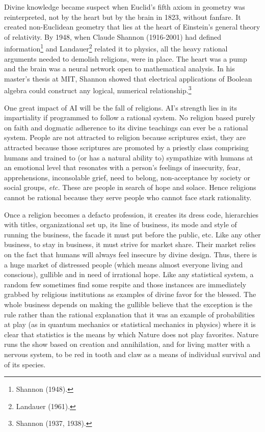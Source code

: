 \begin{multicols}{2}
Divine knowledge became suspect when Euclid's fifth axiom in geometry was reinterpreted, not by the heart but by the brain in 1823, without fanfare. It created non-Euclidean geometry that lies at the heart of Einstein's general theory of relativity. By 1948, when Claude Shannon (1916-2001) had defined information\footnote{Shannon (1948).}  and Landauer\footnote{Landauer (1961).}  related it to physics, all the heavy rational arguments needed to demolish religions, were in place. The heart was a pump and the brain was a neural network open to mathematical analysis. In his master's thesis at MIT, Shannon showed that electrical applications of Boolean algebra could construct any logical, numerical relationship.\footnote{Shannon (1937, 1938).}

One great impact of AI will be the fall of religions. AI's strength lies in its impartiality if programmed to follow a rational system. No religion based purely on faith and dogmatic adherence to its divine teachings can ever be a rational system. People are not attracted to religion because scriptures exist, they are attracted because those scriptures are promoted by a priestly class comprising humans and trained to (or has a natural ability to) sympathize with humans at an emotional level that resonates with a person's feelings of insecurity, fear, apprehensions, inconsolable grief, need to belong, non-acceptance by society or social groups, \textit{etc.} These are people in search of hope and solace. Hence religions cannot be rational because they serve people who cannot face stark rationality.

Once a religion becomes a defacto profession, it creates its dress code, hierarchies with titles, organizational set up, its line of business, its mode and style of running the business, the facade it must put before the public, etc. Like any other business, to stay in business, it must strive for market share. Their market relies on the fact that humans will always feel insecure by divine design. Thus, there is a huge market of distressed people (which means almost everyone living and conscious), gullible and in need of irrational hope. Like any statistical system, a random few sometimes find some respite and those instances are immediately grabbed by religious institutions as examples of divine favor for the blessed. The whole business depends on making the gullible believe that the exception is the rule rather than the rational explanation that it was an example of probabilities at play (as in quantum mechanics or statistical mechanics in physics) where it is clear that statistics is the means by which Nature does not play favorites. Nature runs the show based on creation and annihilation, and for living matter with a nervous system, to be red in tooth and claw as a means of individual survival and of its species.



\end{multicols}
